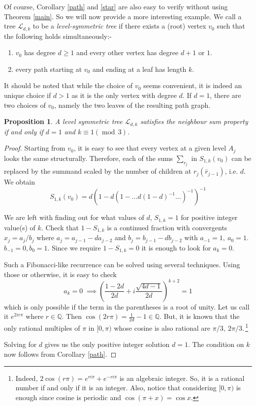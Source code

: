 \documentclass[11pt]{article}
\newtheorem{prp}[nummer]{Proposition}
\begin{document}
Of course, Corollary \ref{path} and \ref{star} are also easy to verify without using Theorem \ref{main}. So we will now provide a more interesting example. We call a tree $\mathcal L_{d,k}$ to be a \textit{level-symmetric tree} if there exists a (root) vertex $v_0$ such that the following holds simultaneously:- \begin{enumerate}
\vspace{-0.19 in}
    \item $v_0$ has degree $d\ge 1$ and every other vertex has degree $d+1$ or $1$.
    \vspace{-0.12 in}\item every path starting at $v_0$ and ending at a leaf has length $k$.
\end{enumerate}
It should be noted that while the choice of $v_0$ seems convenient, it is indeed an unique choice if $d>1$ as it is the only vertex with degree $d$. If $d=1$, there are two choices of $v_0$, namely the two leaves of the resulting path graph.

\begin{prp}
   A level symmetric tree $\mathcal L_{d,k}$ satisfies the neighbour sum property if and only if $d=1$ and $k\equiv 1(\operatorname{mod}\,3)$.
\end{prp}
\begin{proof}
    Starting from $v_0$, it is easy to see that every vertex at a given level $A_j$ looks the same structurally. Therefore, each of the sums $\sum_{r_j}$ in $S_{1,k}(v_0)$ can be replaced by the summand scaled by the number of children at $r_j(\bar{r}_{j-1})$, i.e. $d$. We obtain
    $$S_{1,k}(v_0) = d\left(1-d\left(1-\ldots d\left(1-d\right)^{-1}\ldots\right)^{-1}\right)^{-1}$$

    We are left with finding out for what values of $d$, $S_{1,k}=1$ for positive integer value(s) of $k$. Check that $1-S_{1,k}$ is a continued fraction with convergents $x_j = a_j/b_j$ where $a_j=a_{j-1}-da_{j-2}$ and $b_j=b_{j-1}-db_{j-2}$ with $a_{-1}=1,\:a_0=1$. $b_{-1}=0, b_0=1$. Since we require $1-S_{1,k}=0$ it is enough to look for $a_k=0$. 

    Such a Fibonacci-like recurrence can be solved using several techniques. Using those or otherwise, it is easy to check
    $$a_k = 0\;\implies\left(\dfrac{1-2d}{2d}+i\dfrac{\sqrt{4d-1}}{2d}\right)^{k+2} = 1$$
    which is only possible if the term in the parentheses is a root of unity. Let us call it $e^{2ir\pi}$ where $r\in\mathbb{Q}$. Then $\cos(2r\pi) = \frac{1}{2d}-1\in\mathbb{Q}$. But, it is known that the only rational multiples of $\pi$ in $[0,\pi)$ whose cosine is also rational are $\pi/3,\:2\pi/3$.\,\footnote{Indeed, $2 \cos (r \pi) = e^{r i \pi} + e^{-r i \pi}$ is an algebraic integer. So, it is a rational number if and only if it is an integer. Also, notice that considering $[0,\pi)$ is enough since cosine is periodic and $\cos(\pi+x)=\cos x$.}
    
    Solving for $d$ gives us the only positive integer solution $d=1$. The condition on $k$ now follows from Corollary \ref{path}.
\end{proof}
\end{document}
